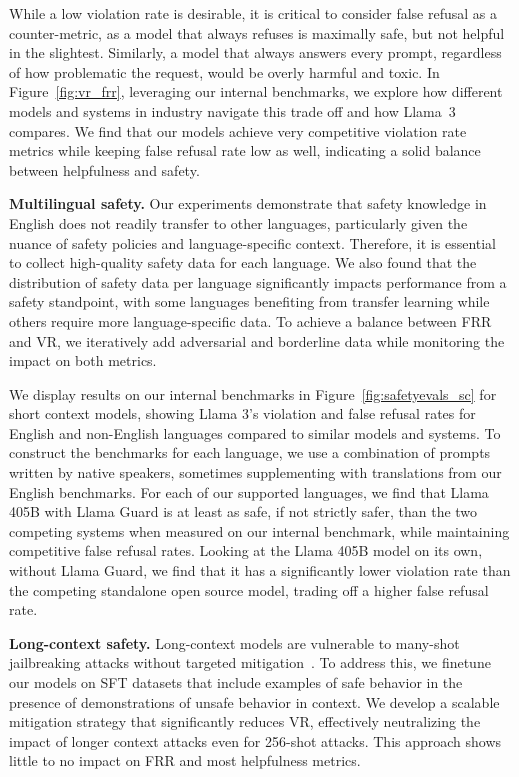 While a low violation rate is desirable, it is critical to consider false refusal as a counter-metric, as a model that always refuses is maximally safe, but not helpful in the slightest. Similarly, a model that always answers every prompt, regardless of how problematic the request, would be overly harmful and toxic. In Figure~\ref{fig:vr_frr}, leveraging our internal benchmarks, we explore how different models and systems in industry navigate this trade off and how Llama~3 compares. We find that our models achieve very competitive violation rate metrics while keeping false refusal rate low as well, indicating a solid balance between helpfulness and safety. 

\textbf{Multilingual safety.} Our experiments demonstrate that safety knowledge in English does not readily transfer to other languages, particularly given the nuance of safety policies and language-specific context. Therefore, it is essential to collect high-quality safety data for each language. We also found that the distribution of safety data per language significantly impacts performance from a safety standpoint, with some languages benefiting from transfer learning while others require more language-specific data. To achieve a balance between FRR and VR, we iteratively add adversarial and borderline data while monitoring the impact on both metrics.

We display results on our internal benchmarks in Figure~\ref{fig:safetyevals_sc} for short context models, showing Llama 3's violation and false refusal rates for English and non-English languages compared to similar models and systems. To construct the benchmarks for each language, we use a combination of prompts written by native speakers, sometimes supplementing with translations from our English benchmarks. For each of our supported languages, we find that Llama 405B with Llama Guard is at least as safe, if not strictly safer, than the two competing systems when measured on our internal benchmark, while maintaining competitive false refusal rates. Looking at the Llama 405B model on its own, without Llama Guard, we find that it has a significantly lower violation rate than the competing standalone open source model, trading off a higher false refusal rate.

\textbf{Long-context safety.} Long-context models are vulnerable to many-shot jailbreaking attacks without targeted mitigation~\citep{anil2024many}. To address this, we finetune our models on SFT datasets that include examples of safe behavior in the presence of demonstrations of unsafe behavior in context. We develop a scalable mitigation strategy that significantly reduces VR, effectively neutralizing the impact of longer context attacks even for 256-shot attacks. This approach shows little to no impact on FRR and most helpfulness metrics. 

